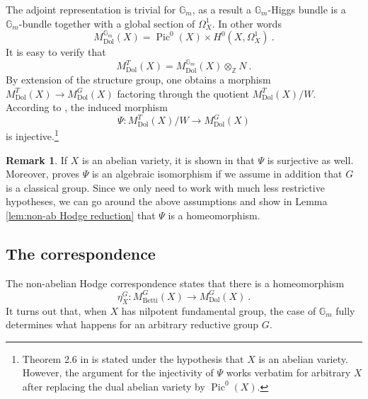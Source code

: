 \documentclass[11pt, a4paper]{amsart}
\theoremstyle{definition}
\newtheorem{remark}[theorem]{Remark}
\theoremstyle{myitemstyle}
\newcommand{\Z}{\mathbb{Z}}
\newcommand{\G}{\mathbb{G}}
\DeclareMathOperator{\Pic}{Pic}
\newcommand{\Dol}{{\mathrm{Dol}}}
\newcommand{\Betti}{{\mathrm{Betti}}}
\begin{document}
The adjoint representation is trivial for $\G_m$, as a result a $\G_m$-Higgs bundle is a $\G_m$-bundle together with a global section of $\Omega^1_X$. In other words
\[
    M^{\G_m}_\Dol(X)= \Pic^0(X) \times H^0(X,\Omega^1_X)\ .
\]
It is easy to verify that
\[
    M^T_\Dol(X)= M^{\G_m}_\Dol(X) \otimes_\Z N \ .
\]
By extension of the structure group, one obtains a morphism $M^T_\Dol(X)\to M^G_\Dol(X)$ factoring through the quotient $M^T_\Dol(X)/W$. According to  \cite[Theorem 2.6]{Bi}, the induced morphism
\[
\Psi\colon    M^T_\Dol(X)/W \to M^G_\Dol(X)
\]
is injective.\footnote{Theorem 2.6 in \cite{Bi} is stated under the hypothesis that $X$ is an abelian variety. However, the argument for the injectivity of $\Psi$ works verbatim for arbitrary $X$ after  replacing the dual abelian variety by $\Pic^0(X)$.} 



\begin{remark}
If $X$ is an abelian variety, it is shown in \cite[Theorem 2.6]{Bi} that $\Psi$ is  surjective as well. Moreover, \cite[Theorem 4]{BFN24} proves  $\Psi$  is an algebraic isomorphism if we assume in addition that $G$ is a classical group. Since we only need to work with much less restrictive hypotheses, we can go around the above assumptions  and show in Lemma \ref{lem:non-ab Hodge reduction} that $\Psi$ is a homeomorphism.  %
\end{remark}
 

\subsection{The correspondence}

The non-abelian Hodge correspondence states that there is a homeomorphism
\[
    \eta^G_X\colon M^{G}_\Betti(X)\to M^G_\Dol(X) \ .
\]
It turns out that, when $X$ has nilpotent fundamental group, the case of $\G_m$ fully determines what happens for an arbitrary reductive group $G$. 
\end{document}
